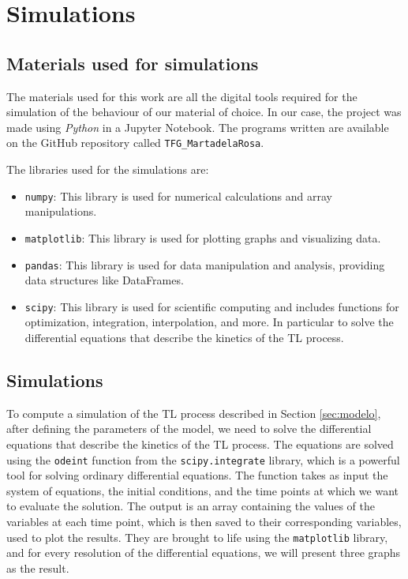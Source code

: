 \chapter{Simulations} \label{ch:4}

\section{Materials used for simulations} \label{sec:materials}

The materials used for this work are all the digital tools required for the simulation of the behaviour of our material of choice. In our case, the project was made using \textit{Python} in a Jupyter Notebook. The programs written are available on the GitHub repository called \texttt{TFG\_MartadelaRosa}. 

\vspace{10pt}

The libraries used for the simulations are:
\begin{itemize}
    \item \texttt{numpy}: This library is used for numerical calculations and array manipulations.
    \item \texttt{matplotlib}: This library is used for plotting graphs and visualizing data.
    \item \texttt{pandas}: This library is used for data manipulation and analysis, providing data structures like DataFrames.
    \item \texttt{scipy}: This library is used for scientific computing and includes functions for optimization, integration, interpolation, and more. In particular to solve the differential equations that describe the kinetics of the TL process.
\end{itemize}



\section{Simulations} \label{sec:simulations}

To compute a simulation of the TL process described in Section \ref{sec:modelo}, after defining the parameters of the model, we need to solve the differential equations that describe the kinetics of the TL process. The equations are solved using the \texttt{odeint} function from the \texttt{scipy.integrate} library, which is a powerful tool for solving ordinary differential equations. The function takes as input the system of equations, the initial conditions, and the time points at which we want to evaluate the solution. The output is an array containing the values of the variables at each time point, which is then saved to their corresponding variables, used to plot the results. They are brought to life using the \texttt{matplotlib} library, and for every resolution of the differential equations, we will present three graphs as the result.

\vspace{10pt}



